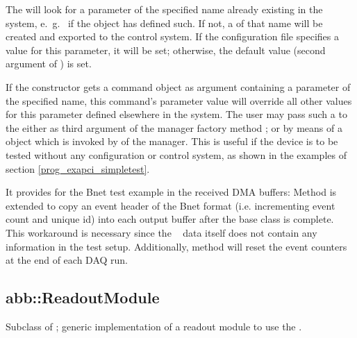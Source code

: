 \begin{compactenum}
\begin{small}
\begin{verbatim}
\end{verbatim}
\end{small} 


The  will look for a parameter of the specified name
already existing in the system, e.~g.~ if the  
object has defined such.
If not, a  of that name will be created and exported
to the control system. If the configuration file
specifies a value for this parameter, it will be set; otherwise, the
default value (second argument of ) is set.

If the constructor gets a command object  
as argument containing a parameter of the specified name,
this command's parameter value will override all other values
for this parameter defined elsewhere in the system. 
The user may pass such a  to the
 either as third argument of the manager factory method 
; or by means of a 
 object which is invoked by
 of the manager. This is useful if the device is to
be tested without any configuration or control system, as shown in the
examples of section \ref{prog_exapci_simpletest}.


\item It provides   for the Bnet test example in the 
received DMA buffers: 
Method  is extended to copy an event header of the Bnet format 
(i.e. incrementing event count and unique id) into each output buffer after 
the base class  is complete. This workaround is necessary since the \ABB~
data itself does not contain any information in the test setup.
Additionally, method  will reset the event counters
at the end of each DAQ run. 


\end{compactenum} 




\subsection{abb::ReadoutModule}
Subclass of ; generic implementation of a readout module to use the .

